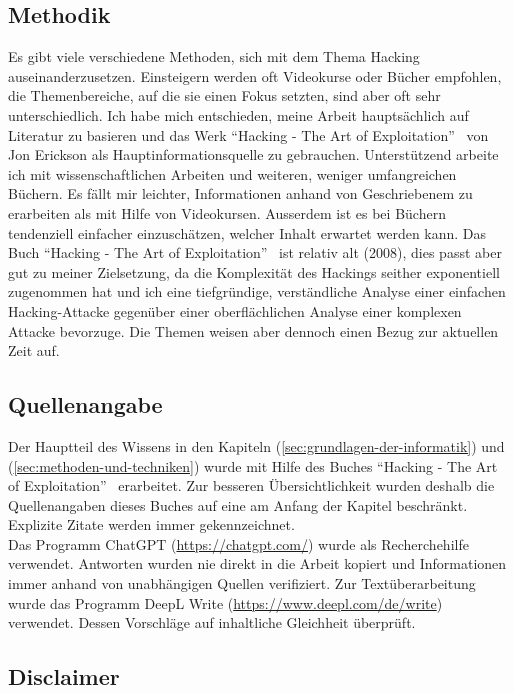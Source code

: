 \documentclass[11pt, a4paper]{article}
\begin{document}
\subsection{Methodik}
Es gibt viele verschiedene Methoden, sich mit dem Thema Hacking auseinanderzusetzen. Einsteigern werden oft Videokurse oder Bücher empfohlen, die Themenbereiche, auf die sie einen Fokus setzten, sind aber oft sehr unterschiedlich. Ich habe mich entschieden, meine Arbeit hauptsächlich auf Literatur zu basieren und das Werk ``Hacking - The Art of Exploitation''~\cite{erickson2008hacking} von Jon Erickson als Hauptinformationsquelle zu gebrauchen. Unterstützend arbeite ich mit wissenschaftlichen Arbeiten und weiteren, weniger umfangreichen Büchern. Es fällt mir leichter, Informationen anhand von Geschriebenem zu erarbeiten als mit Hilfe von Videokursen. Ausserdem ist es bei Büchern tendenziell einfacher einzuschätzen, welcher Inhalt erwartet werden kann. Das Buch ``Hacking - The Art of Exploitation''~\cite{erickson2008hacking} ist relativ alt (2008), dies passt aber gut zu meiner Zielsetzung, da die Komplexität des Hackings seither exponentiell zugenommen hat und ich eine tiefgründige, verständliche Analyse einer einfachen Hacking-Attacke gegenüber einer oberflächlichen Analyse einer komplexen Attacke bevorzuge. Die Themen weisen aber dennoch einen Bezug zur aktuellen Zeit auf.

\subsection{Quellenangabe}
Der Hauptteil des Wissens in den Kapiteln  (\ref{sec:grundlagen-der-informatik}) und  (\ref{sec:methoden-und-techniken}) wurde mit Hilfe des Buches ``Hacking - The Art of Exploitation''~\cite{erickson2008hacking} erarbeitet. Zur besseren Übersichtlichkeit wurden deshalb die Quellenangaben dieses Buches auf eine am Anfang der Kapitel beschränkt. Explizite Zitate werden immer gekennzeichnet. \\ Das Programm ChatGPT (\url{https://chatgpt.com/}) wurde als Recherchehilfe verwendet. Antworten wurden nie direkt in die Arbeit kopiert und Informationen immer anhand von unabhängigen Quellen verifiziert. Zur Textüberarbeitung wurde das Programm DeepL Write (\url{https://www.deepl.com/de/write}) verwendet. Dessen Vorschläge auf inhaltliche Gleichheit überprüft.

\subsection{Disclaimer}
\end{document}
